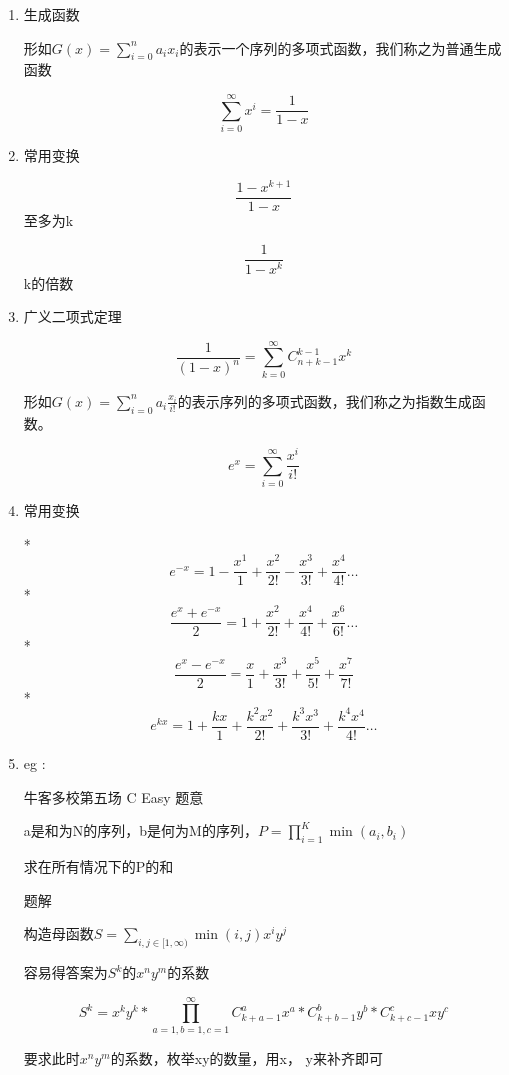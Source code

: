 \begin{enumerate}

\item 生成函数

形如$G(x) = \sum_{i=0}^n a_ix_i$的表示一个序列的多项式函数，我们称之为普通生成函数

$$\sum_{i=0}^{\infty} x^i = \frac{1}{1-x}$$

\item 常用变换

$$\frac{1-x^{k+1}}{1-x}$$ 至多为k

$$\frac{1}{1-x^k}$$ k的倍数

\item 广义二项式定理

$$\frac{1}{(1-x)^n} = \sum_{k=0}^{\infty} C_{n+k-1}^{k-1} x^k$$

形如$G(x) = \sum_{i=0}^n a_i \frac{x_i}{i!}$的表示序列的多项式函数，我们称之为指数生成函数。

$$e^x = \sum_{i=0}^{\infty} \frac{x^i}{i!}$$

\item 常用变换

* $$e^{-x} = 1 - \frac{x^1}{1} + \frac{x^2}{2!} -\frac{x^3}{3!} + \frac{x^4}{4!}\dots$$
* $$\frac{e^x + e^{-x}}{2} = 1 + \frac{x^2}{2!} + \frac{x^4}{4!} + \frac{x^6}{6!}\dots$$
* $$\frac{e^x - e^{-x}}{2} = \frac{x}{1} + \frac{x^3}{3!} + \frac{x^5}{5!} + \frac{x^7}{7!}$$
* $$e^{kx} = 1 + \frac{kx}{1} + \frac{k^2x^2}{2!} + \frac{k^3x^3}{3!} + \frac{k^4x^4}{4!} \dots$$

\item eg :

牛客多校第五场 C Easy 题意

a是和为N的序列，b是何为M的序列，$P = \prod_{i=1}^{K}\min(a_i, b_i)$

求在所有情况下的P的和

题解

构造母函数$S = \sum_{i, j \in [1, \infty)}\min(i, j)x^iy^j$

容易得答案为$S^k$的$x^ny^m$的系数

$$
S^k = x^ky^k*\prod_{a=1, b=1, c=1}^{\infty}C_{k+a-1}^ax^a*C_{k+b-1}^{b}y^b*C_{k+c-1}^c{xy}^c
$$

要求此时$x^ny^m$的系数，枚举xy的数量，用x， y来补齐即可

\end{enumerate}